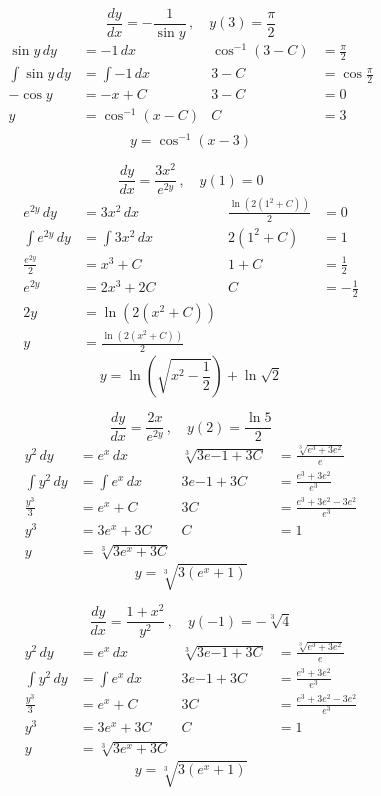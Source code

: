 \documentclass[12pt]{article}
\begin{document}
\begin{multicols}{2}
    \begin{center}
    $$\frac{dy}{dx} = -\frac{1}{\sin y}\,, \quad y(3) = \frac{\pi}{2}$$
    \begin{align*}
        \sin \! y\,dy &= -1\,dx & \cos^{-1}(3 - C) &= \frac{\pi}{2} \\
        \int \sin \! y\,dy &= \int -1\,dx & 3 - C &= \cos \frac{\pi}{2}\\
        -\cos y &= -x + C & 3 - C &= 0 \\
        y &= \cos^{-1}(x - C) & C &= 3\\ 
    \end{align*}
    $$y = \cos^{-1}(x - 3)$$ 

    $$\frac{dy}{dx} = \frac{3x^2}{e^{2y}}\,, \quad y(1) = 0$$
    \begin{align*}
        e^{2y}\,dy &= 3x^2\,dx & \frac{\ln \left( 2\left(1^2 + C\right) \right)}{2} &= 0 \\
        \int e^{2y}\,dy &= \int 3x^2\,dx & 2\left(1^2+C\right) &= 1\\
        \frac{e^{2y}}{2} &= x^3 + C & 1+C &= \frac{1}{2} \\
        e^{2y} &= 2x^3 +2C & C &= -\frac{1}{2}\\
        2y &= \ln \left( 2\left(x^2 + C\right) \right) \\
        y &= \frac{\ln \left( 2\left(x^2 + C\right) \right)}{2}
    \end{align*}
    $$y = \ln \left( \sqrt{x^2 - \frac{1}{2}} \right) + \ln \sqrt{2}$$ 

    \columnbreak 

    $$\frac{dy}{dx} = \frac{2x}{e^{2y}}\,, \quad y(2) = \frac{\ln 5}{2}$$
    \begin{align*}
        y^2\,dy &= e^x\,dx & \sqrt[3]{3e{-1} + 3C} &= \frac{\sqrt[3]{e^3 + 3e^2}}{e} \\
        \int y^2\,dy &= \int e^x\,dx & 3e{-1} + 3C &= \frac{e^3 + 3e^2}{e^3}\\
        \frac{y^3}{3} &= e^x + C & 3C &= \frac{e^3 + 3e^2 - 3e^2}{e^3} \\
        y^3 &= 3e^x + 3C & C &= 1\\
        y &= \sqrt[3]{3e^x + 3C} 
    \end{align*}
    $$y = \sqrt[3]{3(e^x + 1)}$$ 

    $$\frac{dy}{dx} = \frac{1 + x^2}{y^2}\,, \quad y(-1) = -\sqrt[3]{4}$$
    \begin{align*}
        y^2\,dy &= e^x\,dx & \sqrt[3]{3e{-1} + 3C} &= \frac{\sqrt[3]{e^3 + 3e^2}}{e} \\
        \int y^2\,dy &= \int e^x\,dx & 3e{-1} + 3C &= \frac{e^3 + 3e^2}{e^3}\\
        \frac{y^3}{3} &= e^x + C & 3C &= \frac{e^3 + 3e^2 - 3e^2}{e^3} \\
        y^3 &= 3e^x + 3C & C &= 1\\
        y &= \sqrt[3]{3e^x + 3C} 
    \end{align*}
    $$y = \sqrt[3]{3(e^x + 1)}$$ 
    \end{center}
\end{multicols}
\end{document}
